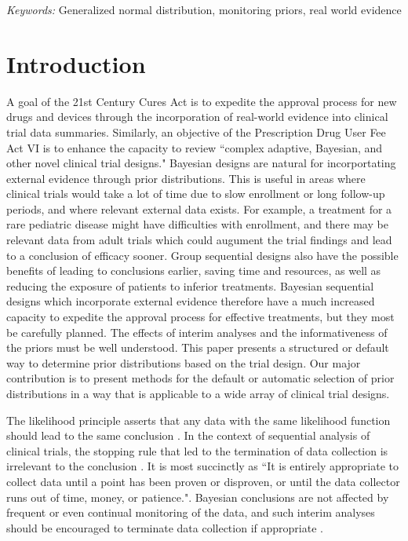 \documentclass[12pt]{article}
\begin{document}
\noindent%
{\it Keywords:}  Generalized normal distribution, monitoring priors, real world evidence
\vfill

\newpage
{} %

\section{Introduction}

A goal of the 21st Century Cures Act \citep{USCongress2016} is to expedite the approval process for new drugs and devices through the incorporation of real-world evidence into clinical trial data summaries. Similarly, an objective of the Prescription Drug User Fee Act VI  is to enhance the capacity to review ``complex adaptive, Bayesian, and other novel clinical trial designs." \citep{FDA2017} Bayesian designs are natural for incorportating external evidence through prior distributions. This is useful in areas where clinical trials would take a lot of time due to slow enrollment or long follow-up periods, and where relevant external data exists. For example, a treatment for a rare pediatric disease might have difficulties with enrollment, and there may be relevant data from adult trials which could augument the trial findings and lead to a conclusion of efficacy sooner. Group sequential designs also have the possible benefits of leading to conclusions earlier, saving time and resources, as well as reducing the exposure of patients to inferior treatments. Bayesian sequential designs which incorporate external evidence therefore have a much increased capacity to expedite the approval process for effective treatments, but they most be carefully planned. The effects of interim analyses and the informativeness of the priors must be well understood. This paper presents a structured or default way to determine prior distributions based on the trial design. Our major contribution is to present methods for the default or automatic selection of prior distributions in a way that is applicable to a wide array of clinical trial designs.


The likelihood principle asserts that any data with the same likelihood function should lead to the same conclusion \citep{Berger1988}. In the context of sequential analysis of clinical trials, the stopping rule that led to the termination of data collection is irrelevant to the conclusion \citep{Barnard1947,Anscombe1963,Cornfield1966a,Cornfield1966b}. It is most succinctly as ``It is entirely appropriate to collect data until a point has been proven or disproven, or until the data collector runs out of time, money, or patience."\citep{Edwards1963}. Bayesian conclusions are not affected by frequent or even continual monitoring of the data, and such interim analyses should be encouraged to terminate data collection if appropriate \citep{Berry1989,Berry1993,Spiegelhalter1994}.
\end{document}

